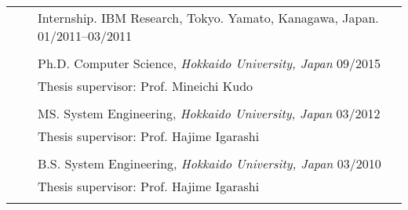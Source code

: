 \documentclass[letterpaper, 11pt]{article}
\begin{document}
\begin{longtable}{p{1.3in}p{2em}p{5.5in}}
    \multirow{1}{1in}{{\color{OliveGreen}{INDUSTRY}}}
                                                    & &\hspace{-3em} Internship. IBM Research, Tokyo. Yamato, Kanagawa, Japan. \hfill 01/2011--03/2011 \\
                                                    & &                                                                                                                                                                                                                          \\
    \color{OliveGreen}{EDUCATION}
                                                    & &\hspace{-3em} Ph.D. Computer Science, \textit{Hokkaido University, Japan} \hfill 09/2015\\
                                                    & &\hspace{-3em} Thesis supervisor: Prof. Mineichi Kudo\\
                                                    & &                                                                                                                                                                                                                          \\

                                                    & &\hspace{-3em} MS. System Engineering, \textit{Hokkaido University, Japan}  \hfill 03/2012\\
                                                    & &\hspace{-3em} Thesis supervisor: Prof. Hajime Igarashi\\
                                                    & &                                                                                                                                                                                                                           \\

                                                    & &\hspace{-3em} B.S. System Engineering, \textit{Hokkaido University, Japan}  \hfill 03/2010\\
                                                    & &\hspace{-3em} Thesis supervisor: Prof. Hajime Igarashi\\
                                                    & &                                                                                                                                                                                                                          \\


\end{longtable}
\end{document}
